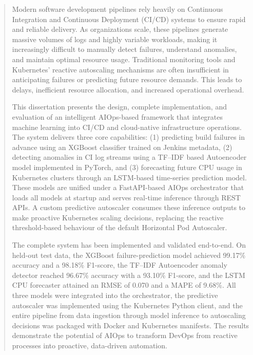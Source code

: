 
\begin{abstract}

Modern software development pipelines rely heavily on Continuous Integration and Continuous Deployment (CI/CD) systems to ensure rapid and reliable delivery. As organizations scale, these pipelines generate massive volumes of logs and highly variable workloads, making it increasingly difficult to manually detect failures, understand anomalies, and maintain optimal resource usage. Traditional monitoring tools and Kubernetes' reactive autoscaling mechanisms are often insufficient in anticipating failures or predicting future resource demands. This leads to delays, inefficient resource allocation, and increased operational overhead.

This dissertation presents the design, complete implementation, and evaluation of an intelligent AIOps-based framework that integrates machine learning into CI/CD and cloud-native infrastructure operations. The system delivers three core capabilities: (1) predicting build failures in advance using an XGBoost classifier trained on Jenkins metadata, (2) detecting anomalies in CI log streams using a TF--IDF based Autoencoder model implemented in PyTorch, and (3) forecasting future CPU usage in Kubernetes clusters through an LSTM-based time-series prediction model. These models are unified under a FastAPI-based AIOps orchestrator that loads all models at startup and serves real-time inference through REST APIs. A custom predictive autoscaler consumes these inference outputs to make proactive Kubernetes scaling decisions, replacing the reactive threshold-based behaviour of the default Horizontal Pod Autoscaler.

The complete system has been implemented and validated end-to-end. On held-out test data, the XGBoost failure-prediction model achieved 99.17\% accuracy and a 98.18\% F1-score, the TF--IDF Autoencoder anomaly detector reached 96.67\% accuracy with a 93.10\% F1-score, and the LSTM CPU forecaster attained an RMSE of 0.070 and a MAPE of 9.68\%. All three models were integrated into the orchestrator, the predictive autoscaler was implemented using the Kubernetes Python client, and the entire pipeline from data ingestion through model inference to autoscaling decisions was packaged with Docker and Kubernetes manifests. The results demonstrate the potential of AIOps to transform DevOps from reactive processes into proactive, data-driven automation.

\end{abstract}

